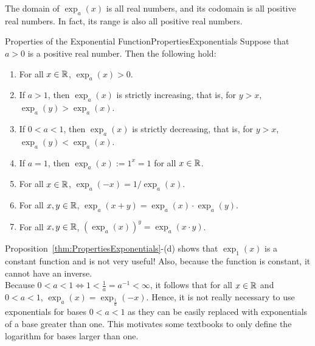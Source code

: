 \begin{rem}
The domain of $\exp_a(x)$ is all real numbers, and its codomain is all positive real numbers. In fact, its range is also all positive real numbers.
\end{rem}

\bigskip

\begin{propColor}{Properties of the Exponential Function}{PropertiesExponentials} 
Suppose that $a>0$ is a positive real number. Then the following hold:
\begin{enumerate}
\renewcommand{\labelenumi}{(\alph{enumi})}
\setlength{\itemsep}{.2cm}
    \item For all $x \in \mathbb R$, $\exp_a(x) >0$. 
    \item If $a>1$, then  $\exp_a(x)$ is strictly increasing, that is, for $y > x$, $\exp_a(y) > \exp_a(x)$.
    \item If $0 < a < 1$, then $\exp_a(x)$ is strictly decreasing, that is, for $y > x$, $\exp_a(y) < \exp_a(x)$.
    \item If $a=1$, then $\exp_a(x):=1^x = 1$ for all $x \in \mathbb R$.
    \item For all $x \in \mathbb R$, $\exp_a(-x) = 1/\exp_a(x)$.
    \item For all $x, y \in \mathbb R$, $\exp_a(x+y) = \exp_a(x) \cdot \exp_a(y)$.
    \item For all $x, y \in \mathbb R$, $\left(\exp_a(x) \right)^y = \exp_a(x\cdot y)$.
\end{enumerate}
    
\end{propColor}
\bigskip

\begin{rem}
Proposition~\ref{thm:PropertiesExponentials}-(d) shows that $\exp_1(x)$ is a constant function and is not very useful! Also, because the function is constant, it cannot have an inverse. \\

 Because $0 < a < 1 \iff 1 < \frac{1}{a} = a^{-1} < \infty$, it follows that for all $x \in \mathbb R$ and $0 < a < 1$, $\exp_a(x)=\exp_{\frac{1}{a}} (-x)$. Hence, it is not really necessary to use exponentials for bases $0 < a < 1$ as they can be easily replaced with exponentials of a base greater than one. This motivates some textbooks to only define the logarithm for bases larger than one.
\end{rem}

